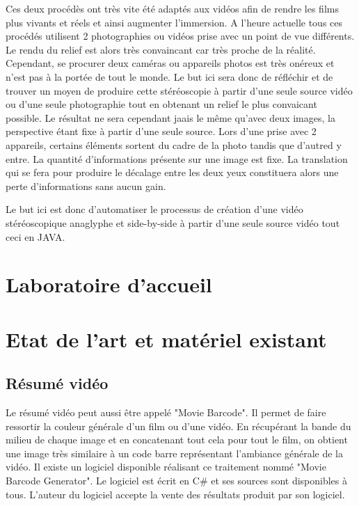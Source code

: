 \documentclass[10pt,a4paper]{article}
\begin{document}
Ces deux procédès ont très vite été adaptés aux vidéos afin de rendre les films plus vivants et réels et ainsi augmenter l'immersion.
A l'heure actuelle tous ces procédés utilisent 2 photographies ou vidéos prise avec un point de vue différents.  Le rendu du relief est alors très convaincant car très proche de la réalité.
Cependant, se procurer deux caméras ou appareils photos est très onéreux et n'est pas à la portée de tout le monde. Le but ici sera donc de réfléchir et de trouver un moyen de produire
cette stéréoscopie à partir d'une seule source vidéo ou d'une seule photographie tout en obtenant un relief le plus convaicant possible. Le résultat ne sera cependant jaais le même qu'avec deux images,
la perspective étant fixe à partir d'une seule source. Lors d'une prise avec 2 appareils, certains éléments sortent du cadre de la photo tandis que d'autred y entre. La quantité
d'informations présente sur une image est fixe. La translation qui se fera pour produire le décalage entre les deux yeux constituera alors une perte d'informations sans aucun gain.

Le but ici est donc d'automatiser le processus de création d'une vidéo stéréoscopique anaglyphe et side-by-side à partir d'une seule source vidéo tout ceci en JAVA.

\section{Laboratoire d'accueil}



\section{Etat de l'art et matériel existant}
\subsection{Résumé vidéo}
Le résumé vidéo peut aussi être appelé "Movie Barcode". Il permet de faire ressortir la couleur générale d'un film ou d'une vidéo. En récupérant la bande du milieu de chaque image et en concatenant tout cela pour
tout le film, on obtient une image très similaire à un code barre représentant l'ambiance générale de la vidéo.
Il existe un logiciel disponible réalisant ce traitement nommé "Movie Barcode Generator". Le logiciel est écrit en C\# et ses sources sont disponibles à tous. L'auteur du logiciel accepte la vente des
résultats produit par son logiciel.
\end{document}
